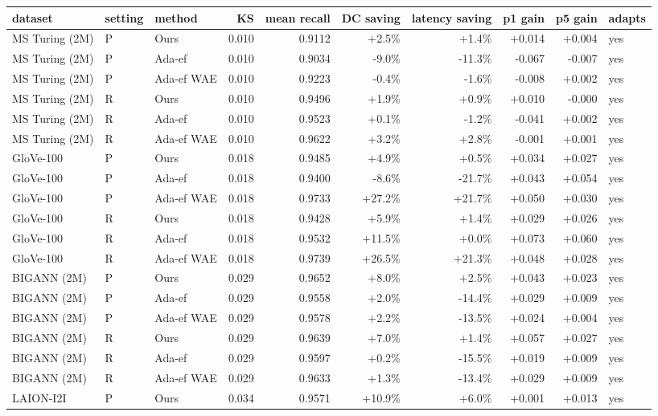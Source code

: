 \begin{tabular}{lllrrrrrrl}
\toprule
dataset & setting & method & KS & mean recall & DC saving & latency saving & p1 gain & p5 gain & adapts \\
\midrule
MS Turing (2M) & P & Ours & 0.010 & 0.9112 & +2.5\% & +1.4\% & +0.014 & +0.004 & yes \\
MS Turing (2M) & P & Ada-ef & 0.010 & 0.9034 & -9.0\% & -11.3\% & -0.067 & -0.007 & yes \\
MS Turing (2M) & P & Ada-ef WAE & 0.010 & 0.9223 & -0.4\% & -1.6\% & -0.008 & +0.002 & yes \\
MS Turing (2M) & R & Ours & 0.010 & 0.9496 & +1.9\% & +0.9\% & +0.010 & -0.000 & yes \\
MS Turing (2M) & R & Ada-ef & 0.010 & 0.9523 & +0.1\% & -1.2\% & -0.041 & +0.002 & yes \\
MS Turing (2M) & R & Ada-ef WAE & 0.010 & 0.9622 & +3.2\% & +2.8\% & -0.001 & +0.001 & yes \\
GloVe-100 & P & Ours & 0.018 & 0.9485 & +4.9\% & +0.5\% & +0.034 & +0.027 & yes \\
GloVe-100 & P & Ada-ef & 0.018 & 0.9400 & -8.6\% & -21.7\% & +0.043 & +0.054 & yes \\
GloVe-100 & P & Ada-ef WAE & 0.018 & 0.9733 & +27.2\% & +21.7\% & +0.050 & +0.030 & yes \\
GloVe-100 & R & Ours & 0.018 & 0.9428 & +5.9\% & +1.4\% & +0.029 & +0.026 & yes \\
GloVe-100 & R & Ada-ef & 0.018 & 0.9532 & +11.5\% & +0.0\% & +0.073 & +0.060 & yes \\
GloVe-100 & R & Ada-ef WAE & 0.018 & 0.9739 & +26.5\% & +21.3\% & +0.048 & +0.028 & yes \\
BIGANN (2M) & P & Ours & 0.029 & 0.9652 & +8.0\% & +2.5\% & +0.043 & +0.023 & yes \\
BIGANN (2M) & P & Ada-ef & 0.029 & 0.9558 & +2.0\% & -14.4\% & +0.029 & +0.009 & yes \\
BIGANN (2M) & P & Ada-ef WAE & 0.029 & 0.9578 & +2.2\% & -13.5\% & +0.024 & +0.004 & yes \\
BIGANN (2M) & R & Ours & 0.029 & 0.9639 & +7.0\% & +1.4\% & +0.057 & +0.027 & yes \\
BIGANN (2M) & R & Ada-ef & 0.029 & 0.9597 & +0.2\% & -15.5\% & +0.019 & +0.009 & yes \\
BIGANN (2M) & R & Ada-ef WAE & 0.029 & 0.9633 & +1.3\% & -13.4\% & +0.029 & +0.009 & yes \\
LAION-I2I & P & Ours & 0.034 & 0.9571 & +10.9\% & +6.0\% & +0.001 & +0.013 & yes \\

\end{tabular}
